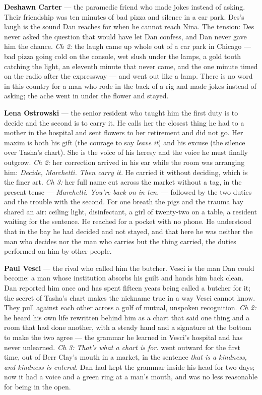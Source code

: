 \documentclass{design/chronicle}
\begin{document}
{\textbf{Deshawn Carter} — the paramedic friend who made jokes instead of asking. Their friendship was ten minutes of bad pizza and silence in a car park. Des’s laugh is the sound Dan reaches for when he cannot reach Nina. The tension: Des never asked the question that would have let Dan confess, and Dan never gave him the chance. \emph{Ch 2:} the laugh came up whole out of a car park in Chicago --- bad pizza going cold on the console, wet slush under the lamps, a gold tooth catching the light, an eleventh minute that never came, and the one minute timed on the radio after the expressway --- and went out like a lamp. There is no word in this country for a man who rode in the back of a rig and made jokes instead of asking; the ache went in under the flower and stayed.

\textbf{Lena Ostrowski} — the senior resident who taught him the first duty is to decide and the second is to carry it. He calls her the closest thing he had to a mother in the hospital and sent flowers to her retirement and did not go. Her maxim is both his gift (the courage to say \emph{leave it}) and his excuse (the silence over Tasha’s chart). She is the voice of his heresy and the voice he must finally outgrow. \emph{Ch 2:} her correction arrived in his ear while the room was arranging him: \emph{Decide, Marchetti. Then carry it.} He carried it without deciding, which is the finer art. \emph{Ch 3:} her full name cut across the market without a tag, in the present tense — \emph{Marchetti. You’re back on in ten.} — followed by the two duties and the trouble with the second. For one breath the pigs and the trauma bay shared an air: ceiling light, disinfectant, a girl of twenty-two on a table, a resident waiting for the sentence. He reached for a pocket with no phone. He understood that in the bay he had decided and not stayed, and that here he was neither the man who decides nor the man who carries but the thing carried, the duties performed on him by other people.

\textbf{Paul Vesci} — the rival who called him the butcher. Vesci is the man Dan could become: a man whose institution absorbs his guilt and hands him back clean. Dan reported him once and has spent fifteen years being called a butcher for it; the secret of Tasha’s chart makes the nickname true in a way Vesci cannot know. They pull against each other across a gulf of mutual, unspoken recognition. \emph{Ch 2:} he heard his own life rewritten behind him as a chart that said one thing and a room that had done another, with a steady hand and a signature at the bottom to make the two agree --- the grammar he learned in Vesci’s hospital and has never unlearned. \emph{Ch 3:} \emph{That’s what a chart is for.} went outward for the first time, out of Berr Clay’s mouth in a market, in the sentence \emph{that is a kindness, and kindness is entered}. Dan had kept the grammar inside his head for two days; now it had a voice and a green ring at a man’s mouth, and was no less reasonable for being in the open.

}
\end{document}
